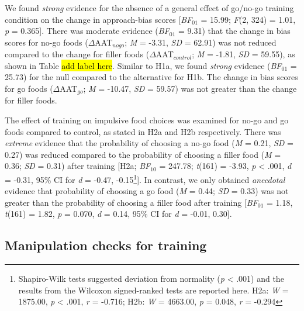 \documentclass[man,floatsintext]{apa6}
\let\rmarkdownfootnote\footnote%
\def\footnote{\protect\rmarkdownfootnote}
\begin{document}
\par

We found \emph{strong} evidence for the absence of a general effect of
go/no-go training condition on the change in approach-bias scores
{[}\emph{BF}\(_{01}\) = 15.99; \emph{F}(2, 324) = 1.01, \emph{p} =
0.365{]}. There was moderate evidence (\emph{BF}\(_{01}\) = 9.31) that
the change in bias scores for no-go foods (\(\Delta\)AAT\(_{nogo}\);
\emph{M} = -3.31, \emph{SD} = 62.91) was not reduced compared to the
change for filler foods (\(\Delta\)AAT\(_{control}\); \emph{M} = -1.81,
\emph{SD} = 59.55), as shown in Table \hl{add label here}. Similar to
H1a, we found \emph{strong} evidence (\emph{BF}\(_{01}\) = 25.73) for
the null compared to the alternative for H1b. The change in bias scores
for go foods (\(\Delta\)AAT\(_{go}\); \emph{M} = -10.47, \emph{SD} =
59.57) was not greater than the change for filler foods.

\par

The effect of training on impulsive food choices was examined for no-go
and go foods compared to control, as stated in H2a and H2b respectively.
There was \emph{extreme} evidence that the probability of choosing a
no-go food (\emph{M} = 0.21, \emph{SD} = 0.27) was reduced compared to
the probability of choosing a filler food (\emph{M} = 0.36; \emph{SD} =
0.31) after training {[}H2a; \emph{BF}\(_{10}\) = 247.78; \emph{t}(161)
= -3.93, \emph{p} \textless{} .001, \emph{d} = -0.31, 95\% CI for
\emph{d} = -0.47,
-0.15\footnote{Shapiro-Wilk tests suggested deviation from normality (\textit{p} < .001) and the results from the Wilcoxon signed-ranked tests are reported here. H2a: \textit{W} = 1875.00, \textit{p} < .001, \textit{r} = -0.716; H2b: \textit{W} = 4663.00, \textit{p} = 0.048, \textit{r} = -0.294}{]}.
In contrast, we only obtained \emph{anecdotal} evidence that probability
of choosing a go food (\emph{M} = 0.44; \emph{SD} = 0.33) was not
greater than the probability of choosing a filler food after training
{[}\emph{BF}\(_{01}\) = 1.18, \emph{t}(161) = 1.82, \emph{p} = 0.070,
\emph{d} = 0.14, 95\% CI for \emph{d} = -0.01, 0.30{]}.

\subsection{Manipulation checks for
training}\label{manipulation-checks-for-training}

\par
\end{document}
